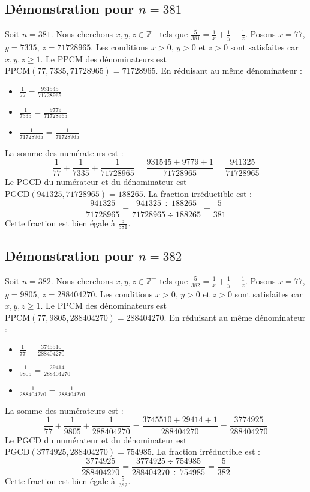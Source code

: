 \documentclass[11pt,a4paper]{article}
\begin{document}
\subsection{Démonstration pour $n = 381$}
Soit $n = 381$. Nous cherchons $x, y, z \in \mathbb{Z}^{+}$ tels que $\frac{5}{381} = \frac{1}{x} + \frac{1}{y} + \frac{1}{z}$.
Posons $x = 77$, $y = 7335$, $z = 71728965$.
Les conditions $x > 0$, $y > 0$ et $z > 0$ sont satisfaites car $x, y, z \geq 1$.
Le PPCM des dénominateurs est $\text{PPCM}(77, 7335, 71728965) = 71728965$.
En réduisant au même dénominateur :
\begin{itemize}
    \item $\frac{1}{77} = \frac{931545}{71728965}$
    \item $\frac{1}{7335} = \frac{9779}{71728965}$
    \item $\frac{1}{71728965} = \frac{1}{71728965}$
\end{itemize}
La somme des numérateurs est :
$$ \frac{1}{77} + \frac{1}{7335} + \frac{1}{71728965} = \frac{931545 + 9779 + 1}{71728965} = \frac{941325}{71728965} $$
Le PGCD du numérateur et du dénominateur est $\text{PGCD}(941325, 71728965) = 188265$.
La fraction irréductible est :
$$ \frac{941325}{71728965} = \frac{941325 \div 188265}{71728965 \div 188265} = \frac{5}{381} $$
Cette fraction est bien égale à $\frac{5}{381}$.

\subsection{Démonstration pour $n = 382$}
Soit $n = 382$. Nous cherchons $x, y, z \in \mathbb{Z}^{+}$ tels que $\frac{5}{382} = \frac{1}{x} + \frac{1}{y} + \frac{1}{z}$.
Posons $x = 77$, $y = 9805$, $z = 288404270$.
Les conditions $x > 0$, $y > 0$ et $z > 0$ sont satisfaites car $x, y, z \geq 1$.
Le PPCM des dénominateurs est $\text{PPCM}(77, 9805, 288404270) = 288404270$.
En réduisant au même dénominateur :
\begin{itemize}
    \item $\frac{1}{77} = \frac{3745510}{288404270}$
    \item $\frac{1}{9805} = \frac{29414}{288404270}$
    \item $\frac{1}{288404270} = \frac{1}{288404270}$
\end{itemize}
La somme des numérateurs est :
$$ \frac{1}{77} + \frac{1}{9805} + \frac{1}{288404270} = \frac{3745510 + 29414 + 1}{288404270} = \frac{3774925}{288404270} $$
Le PGCD du numérateur et du dénominateur est $\text{PGCD}(3774925, 288404270) = 754985$.
La fraction irréductible est :
$$ \frac{3774925}{288404270} = \frac{3774925 \div 754985}{288404270 \div 754985} = \frac{5}{382} $$
Cette fraction est bien égale à $\frac{5}{382}$.
\end{document}
